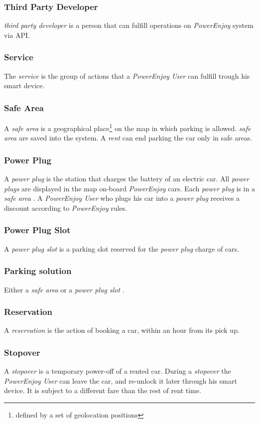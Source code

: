 \documentclass[english]{article}
\newcommand{\rent}{\textit{rent }}
\newcommand{\powerenjoy}{\textit{PowerEnjoy }}
\newcommand{\powerenjoyuser}{\textit{PowerEnjoy User }}
\newcommand{\service}{\textit{service }}
\newcommand{\safearea}{\textit{safe area }}
\newcommand{\powerplug}{\textit{power plug }}
\newcommand{\powerplugs}{\textit{power plugs }}
\newcommand{\resevation}{\textit{reservation }}
\newcommand{\stopover}{\textit{stopover }}
\newcommand{\thirdparty}{\textit{third party developer }}
\newcommand{\powerplugslot}{\textit{power plug slot }}
\begin{document}
		\subsubsection{Third Party Developer}
			\thirdparty is a person that can fulfill operations on \powerenjoy system via API.
		\subsubsection{Service}
			The \service is the group of actions that a \powerenjoyuser can fulfill trough his smart device.	
		\subsubsection {Safe Area}
			A \safearea is a  geographical place\footnote{defined by a set of geolocation positions} on the map in which parking is allowed. \safearea are saved into the system. A \rent can end parking the car only in safe areas.
	\subsubsection{Power Plug}
		A \powerplug is the station that charges the battery of an electric car. All \powerplugs are displayed in the map on-board \powerenjoy cars. Each \powerplug is in a \safearea. A \powerenjoyuser who plugs his car into a \powerplug receives a discount according to \powerenjoy rules.
	\subsubsection{Power Plug Slot}
		A \powerplugslot is a parking slot reserved for the \powerplug charge of cars.
	\subsubsection{Parking solution}
		Either a \safearea or a \powerplugslot.
	\subsubsection{Reservation}
		A \resevation is the action of booking a car, within an hour from its pick up.
	\subsubsection{Stopover}
		A \stopover is a temporary power-off of a rented car. During a \stopover the \powerenjoyuser can leave the car,  and re-unlock it later through his smart device. It is subject to a different fare than the rest of rent time.
\end{document}
